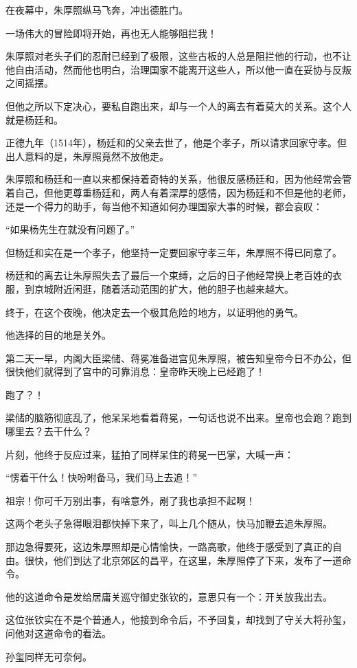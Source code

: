 \begin{multicols}{\theparacolNo}
在夜幕中，朱厚照纵马飞奔，冲出德胜门。

一场伟大的冒险即将开始，再也无人能够阻拦我！

朱厚照对老头子们的忍耐已经到了极限，这些古板的人总是阻拦他的行动，也不让他自由活动，然而他也明白，治理国家不能离开这些人，所以他一直在妥协与反叛之间摇摆。

但他之所以下定决心，要私自跑出来，却与一个人的离去有着莫大的关系。这个人就是杨廷和。

正德九年（1514年），杨廷和的父亲去世了，他是个孝子，所以请求回家守孝。但出人意料的是，朱厚照竟然不放他走。

朱厚照和杨廷和一直以来都保持着奇特的关系，他很反感杨廷和，因为他经常会管着自己，但他更尊重杨廷和，两人有着深厚的感情，因为杨廷和不但是他的老师，还是一个得力的助手，每当他不知道如何办理国家大事的时候，都会哀叹：

“如果杨先生在就没有问题了。”

但杨廷和实在是一个孝子，他坚持一定要回家守孝三年，朱厚照不得已同意了。

杨廷和的离去让朱厚照失去了最后一个束缚，之后的日子他经常换上老百姓的衣服，到京城附近闲逛，随着活动范围的扩大，他的胆子也越来越大。

终于，在这个夜晚，他决定去一个极其危险的地方，以证明他的勇气。

他选择的目的地是关外。

第二天一早，内阁大臣梁储、蒋冕准备进宫见朱厚照，被告知皇帝今日不办公，但很快他们就得到了宫中的可靠消息：皇帝昨天晚上已经跑了！

跑了？！

梁储的脑筋彻底乱了，他呆呆地看着蒋冕，一句话也说不出来。皇帝也会跑？跑到哪里去？去干什么？

片刻，他终于反应过来，猛拍了同样呆住的蒋冕一巴掌，大喊一声：

“愣着干什么！快吩咐备马，我们马上去追！”

祖宗！你可千万别出事，有啥意外，剐了我也承担不起啊！

这两个老头子急得眼泪都快掉下来了，叫上几个随从，快马加鞭去追朱厚照。

那边急得要死，这边朱厚照却是心情愉快，一路高歌，他终于感受到了真正的自由。很快，他们到达了北京郊区的昌平，在这里，朱厚照停了下来，发布了一道命令。

他的这道命令是发给居庸关巡守御史张钦的，意思只有一个：开关放我出去。

这位张钦实在不是个普通人，他接到命令后，不予回复，却找到了守关大将孙玺，问他对这道命令的看法。

孙玺同样无可奈何。


\end{multicols}
